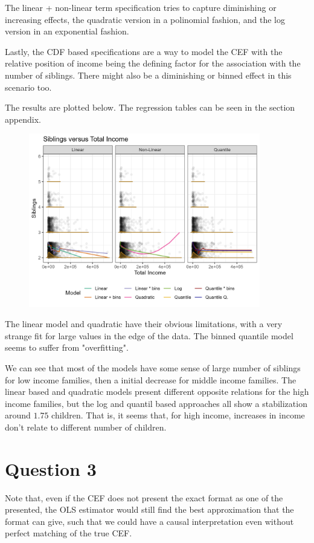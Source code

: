 \documentclass[12pt]{article}
\begin{document}
The linear + non-linear term specification tries to capture diminishing or increasing effects, the quadratic version in a polinomial fashion, and the log version in an exponential fashion.

Lastly, the CDF based specifications are a way to model the CEF with the relative position of income being the defining factor for the association with the number of siblings. There might also be a diminishing or binned effect in this scenario too. 

The results are plotted below. The regression tables can be seen in the section appendix.

\begin{figure}[!htbp]
    \centering
    \includegraphics[width=0.9\textwidth]{Figures/cefs.png}
    \label{fig:cefs}
\end{figure}

The linear model and quadratic have their obvious limitations, with a very strange fit for large values in the edge of the data. The binned quantile model seems to suffer from "overfitting".

We can see that most of the models have some sense of large number of siblings for low income families, then a initial decrease for middle income families. The linear based and quadratic models present different opposite relations for the high income families, but the log and quantil based approaches all show a stabilization around $1.75$ children. That is, it seems that, for high income, increases in income don't relate to different number of children.


\section*{Question 3}
Note that, even if the CEF does not present the exact format as one of the presented, the OLS estimator would still find the best approximation that the format can give, such that we could have a causal interpretation even without perfect matching of the true CEF.
\end{document}
